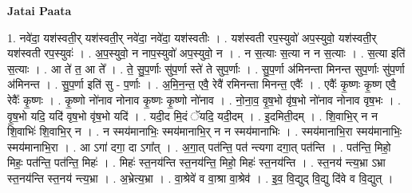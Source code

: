 \documentclass[17pt]{extarticle}
\begin{document}
\textbf{Jatai Paata} \newline

1. नवे॑दा॒ यश॑स्वती॒र् यश॑स्वती॒र् नवे॑दा॒ नवे॑दा॒ यश॑स्वतीः । . यश॑स्वती रप॒स्युवो॑ अप॒स्युवो॒ यश॑स्वती॒र् यश॑स्वती रप॒स्युवः॑ । . अ॒प॒स्युवो॒ न नाप॒स्युवो॑ अप॒स्युवो॒ न । . न स॒त्याः स॒त्या न न स॒त्याः । . स॒त्या इति॑ स॒त्याः । . आ ते॑ त॒ आ ते᳚ । . ते॒ सु॒प॒र्णाः सु॑प॒र्णा स्ते॑ ते सुप॒र्णाः । . सु॒प॒र्णा अ॑मिनन्ता मिनन्त सुप॒र्णाः सु॑प॒र्णा अ॑मिनन्त । . सु॒प॒र्णा इति॑ सु - प॒र्णाः । . अ॒मि॒न॒न्त॒ एवै॒ रेवै॑ रमिनन्ता मिनन्त॒ एवैः᳚ । . एवैः᳚ कृ॒ष्णः कृ॒ष्ण एवै॒ रेवैः᳚ कृ॒ष्णः । . कृ॒ष्णो नो॑नाव नोनाव कृ॒ष्णः कृ॒ष्णो नो॑नाव । . नो॒ना॒व॒ वृ॒ष॒भो वृ॑ष॒भो नो॑नाव नोनाव वृष॒भः । . वृ॒ष॒भो यदि॒ यदि॑ वृष॒भो वृ॑ष॒भो यदि॑ । . यदी॒द मि॒दं ॅयदि॒ यदी॒दम् । . इ॒दमिती॒दम् । . शि॒वाभि॒र् न न शि॒वाभिः॑ शि॒वाभि॒र् न । . न स्मय॑मानाभिः॒ स्मय॑मानाभि॒र् न न स्मय॑मानाभिः । . स्मय॑मानाभि॒रा स्मय॑मानाभिः॒ स्मय॑मानाभि॒रा । . आ ऽगा॑ दगा॒ दा ऽगा᳚त् । . अ॒गा॒त् पत॑न्ति॒ पत॑ न्त्यगा दगा॒त् पत॑न्ति । . पत॑न्ति॒ मिहो॒ मिहः॒ पत॑न्ति॒ पत॑न्ति॒ मिहः॑ । . मिहः॑ स्त॒नय॑न्ति स्त॒नय॑न्ति॒ मिहो॒ मिहः॑ स्त॒नय॑न्ति । . स्त॒नय॑ न्त्य॒भ्रा ऽभ्रा स्त॒नय॑न्ति स्त॒नय॑ न्त्य॒भ्रा । . अ॒भ्रेत्य॒भ्रा । . वा॒श्रेवे॑ व वा॒श्रा वा॒श्रेव॑ । . इ॒व॒ वि॒द्युद् वि॒द्यु दि॑वे व वि॒द्युत् । \newline
\end{document}

